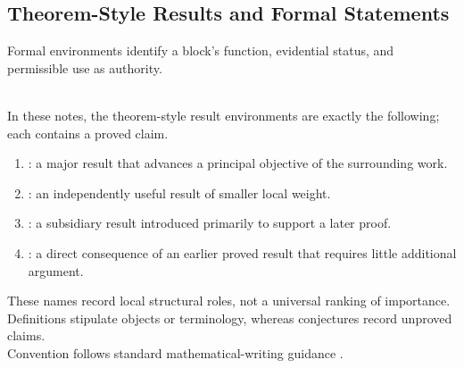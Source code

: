 \subsection{Theorem-Style Results and Formal Statements}

Formal environments identify a block's function, evidential status, and permissible use as authority.

\begin{convention} \label{conv:theorem-style-result-hierarchy} \\
In these notes, the theorem-style result environments are exactly the following; each contains a proved claim.
\begin{enumerate}[label=(\roman*)]
\setlength{\itemsep}{0pt}
\item {}: a major result that advances a principal objective of the surrounding work.
\item {}: an independently useful result of smaller local weight.
\item {}: a subsidiary result introduced primarily to support a later proof.
\item {}: a direct consequence of an earlier proved result that requires little additional argument.
\end{enumerate}
These names record local structural roles, not a universal ranking of importance.\\
Definitions stipulate objects or terminology, whereas conjectures record unproved claims.\\
Convention follows standard mathematical-writing guidance \citep{mit1998mathematicalwriting}.
\end{convention}

